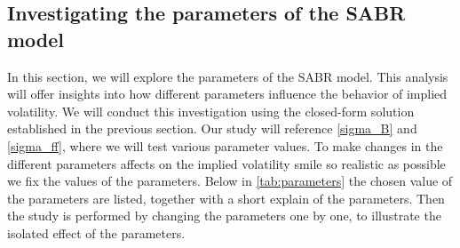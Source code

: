 \subsection{Investigating the parameters of the SABR model}
In this section, we will explore the parameters of the SABR model. This analysis will offer insights into 
how different parameters influence the behavior of implied volatility. We will conduct this investigation using 
the closed-form solution established in the previous section. Our study will reference \autoref{sigma_B} and 
\autoref{sigma_ff}, where we will test various parameter values. To make changes in the different parameters
affects on the implied volatility smile so realistic as possible we fix the values of the parameters.
Below in \autoref{tab:parameters} the chosen value of the parameters are listed, together with a short
explain of the parameters. Then the study is performed by changing the parameters one by one, to illustrate the 
isolated effect of the parameters. 

